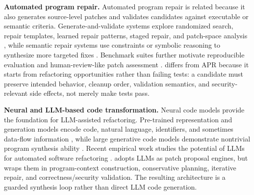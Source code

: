 \noindent\textbf{Automated program repair.}
Automated program repair is related because it also generates source-level
patches and validates candidates against executable or semantic criteria.
Generate-and-validate systems explore randomized search, repair templates,
learned repair patterns, staged repair, and patch-space analysis
\cite{le2011genprog,qi2014strength,kim2013automatic,long2015staged,
long2016automatic,long2016analysis}, while semantic repair systems use
constraints or symbolic reasoning to synthesize more targeted fixes
\cite{nguyen2013semfix,mechtaev2015directfix,mechtaev2016angelix}. Benchmark
suites further motivate reproducible evaluation and human-review-like patch
assessment \cite{just2014defects4j,madeiral2019bears,saha2018bugs,
karampatsis2020often,ye2021comprehensive}. \SysName{} differs from APR because
it starts from refactoring opportunities rather than failing tests: a candidate
must preserve intended behavior, cleanup order, validation semantics, and
security-relevant side effects, not merely make tests pass.

\noindent\textbf{Neural and LLM-based code transformation.}
Neural code models provide the foundation for LLM-assisted refactoring.
Pre-trained representation and generation models encode code, natural
language, identifiers, and sometimes data-flow information
\cite{feng2020codebert,guo2020graphcodebert,ahmad2021unified,wang2021codet5},
while large generative code models demonstrate nontrivial program synthesis
ability \cite{chen2021evaluating,li2022competition}. Recent empirical work
studies the potential of LLMs for automated software refactoring
\cite{liu2024empirical}. \SysName{} adopts LLMs as patch proposal engines, but
wraps them in program-context construction, conservative planning, iterative
repair, and correctness/security validation. The resulting architecture is a
guarded synthesis loop rather than direct LLM code generation.

